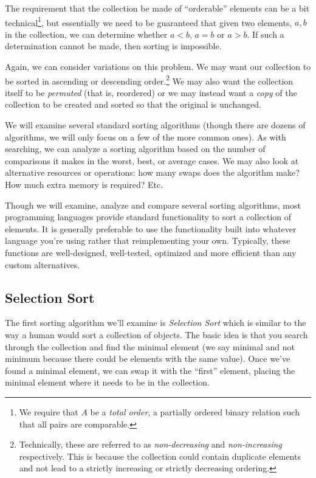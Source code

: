 The requirement that the collection be made of ``orderable'' elements can be
a bit technical\footnote{We require that $A$ be a \emph{total order}, a 
partially ordered binary relation such that all pairs are comparable.}, but essentially 
we need to be guaranteed that given two elements, $a, b$ in the collection, 
we can determine whether $a < b$, $a = b$ or $a > b$.  If such a determination
cannot be made, then sorting is impossible.

Again, we can consider variations on this problem.  We may want our collection
to be sorted in ascending or descending order.\footnote{Technically, these are
referred to as \emph{non-decreasing} and \emph{non-increasing} respectively.  
This is because the collection could contain duplicate elements and not lead
to a strictly increasing or strictly decreasing ordering.} We may also want
the collection itself to be \emph{permuted} (that is, reordered) or we may
instead want a \emph{copy} of the collection to be created and sorted so that
the original is unchanged.

We will examine several standard sorting algorithms (though there are dozens
of algorithms, we will only focus on a few of the more common ones).  As with 
searching, we can analyze a sorting algorithm based on the number of 
comparisons it makes in the worst, best, or average cases.  We may also look
at alternative resources or operations: how many swaps does the algorithm make?
How much extra memory is required?  Etc.

Though we will examine, analyze and compare several sorting algorithms, most
programming languages provide standard functionality to sort a collection of
elements.  It is generally preferable to use the functionality built into 
whatever language you're using rather that reimplementing your own.  Typically, 
these functions are well-designed, well-tested, optimized and more efficient
than any custom alternatives.

\subsection{Selection Sort}

The first sorting algorithm we'll examine is \emph{Selection Sort} which is
similar to the way a human would sort a collection of objects.  The basic idea
is that you search through the collection and find the minimal element 
(we say minimal and not minimum because there could be elements with the
same value).  Once we've found a minimal element, we can swap it with the
``first'' element, placing the minimal element where it needs to be in
the collection.  

